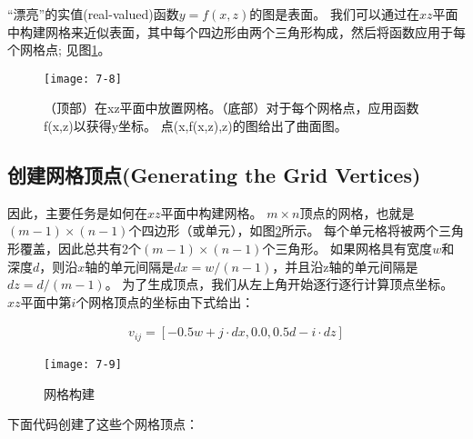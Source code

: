 \begin{flushleft}
“漂亮”的实值(real-valued)函数$y=f(x,z)$的图是表面。 我们可以通过在$xz$平面中构建网格来近似表面，其中每个四边形由两个三角形构成，然后将函数应用于每个网格点; 见图\ref{fig:7-8}。
\end{flushleft}

\begin{figure}[h]
    \texttt{[image: 7-8]}
    \centering
    \caption{（顶部）在xz平面中放置网格。（底部）对于每个网格点，应用函数f(x,z)以获得y坐标。 点(x,f(x,z),z)的图给出了曲面图。}
    \label{fig:7-8}
\end{figure}
\clearpage

\subsection{创建网格顶点(Generating the Grid Vertices)}
\begin{flushleft}
因此，主要任务是如何在$xz$平面中构建网格。 $m\times n$顶点的网格，也就是$(m-1)\times(n-1)$个四边形（或单元），如图\ref{fig:7-9}所示。 每个单元格将被两个三角形覆盖，因此总共有2个$(m-1)\times(n-1)$个三角形。 如果网格具有宽度$w$和深度$d$，则沿$x$轴的单元间隔是$dx=w/(n-1)$，并且沿z轴的单元间隔是$dz=d/(m-1)$。 为了生成顶点，我们从左上角开始逐行逐行计算顶点坐标。 $xz$平面中第$i$个网格顶点的坐标由下式给出：\\
\end{flushleft}

\begin{align*}
v_{ij}=[-0.5w+j\cdot dx,0.0,0.5d-i\cdot dz]
\end{align*}

\begin{figure}[h]
    \texttt{[image: 7-9]}
    \centering
    \caption{网格构建}
    \label{fig:7-9}
\end{figure}
\clearpage

\begin{flushleft}
下面代码创建了这些个网格顶点：\\
\end{flushleft}


